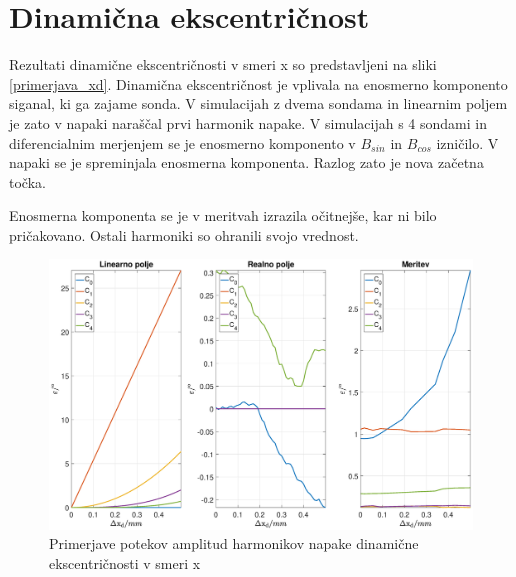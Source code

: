 \section{Dinamična ekscentričnost}
Rezultati dinamične ekscentričnosti v smeri x so predstavljeni na sliki \ref{primerjava_xd}. Dinamična ekscentričnost je vplivala na enosmerno komponento siganal, ki ga zajame sonda. V simulacijah z dvema sondama in linearnim poljem je zato v napaki naraščal prvi harmonik napake. V simulacijah s 4 sondami in diferencialnim merjenjem  se je enosmerno komponento v $B_{sin}$ in $B_{cos}$ izničilo. V napaki se je spreminjala  enosmerna komponenta. Razlog zato je nova začetna točka.

Enosmerna komponenta se je v meritvah izrazila očitnejše, kar ni bilo pričakovano. Ostali harmoniki so ohranili svojo vrednost.
\begin{figure}[ht]
	\centering
	\includegraphics[width=\columnwidth]{./Slike/primerjava_xd.eps}
	\caption{Primerjave potekov amplitud harmonikov napake  dinamične ekscentričnosti v smeri x}
	\label{primerjava_xs}
\end{figure}
